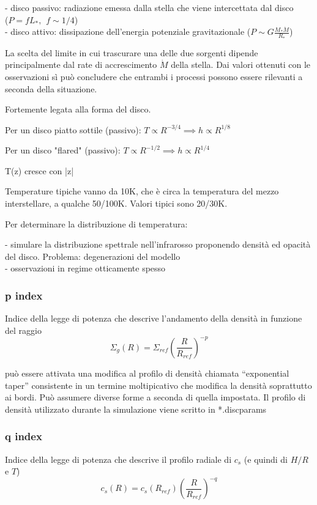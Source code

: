 \documentclass[DIN, pagenumber=false, fontsize=11pt, parskip=half]{scrartcl}
\begin{document}
- disco passivo: radiazione emessa dalla stella che viene intercettata dal disco \\($P=fL_*, \hspace{5pt} f\sim 1/4$) \\
- disco attivo: dissipazione dell'energia potenziale gravitazionale ($P \sim 
G \frac{M_*\dot{M}}{R_*}$)

La scelta del limite in cui trascurare una delle due sorgenti dipende principalmente dal rate di accrescimento $\dot{M}$  della stella. Dai valori ottenuti con le osservazioni sì può concludere che entrambi i processi possono essere rilevanti a seconda della situazione.

Fortemente legata alla forma del disco.

Per un disco piatto sottile (passivo): $T \propto R^{-3/4} \implies h \propto R^{1/8}$

Per un disco "flared" (passivo): $T \propto R^{-1/2} \implies h \propto R^{1/4}$ 

T(z) cresce con |z|

Temperature tipiche vanno da 10K, che è circa la temperatura del mezzo interstellare, a qualche 50/100K. Valori tipici sono 20/30K.

Per determinare la distribuzione di temperatura:

- simulare la distribuzione spettrale nell'infrarosso proponendo densità ed opacità del disco. Problema: degenerazioni del modello\\
- osservazioni in regime otticamente spesso

\subsubsection{p index}
\label{pind}
Indice della legge di potenza che descrive l'andamento della densità in funzione del raggio
\begin{equation}
    \Sigma_g(R) = \Sigma_{ref} \left( \frac{R}{R_{ref}}\right)^{-p}
\end{equation}

può essere attivata una modifica al profilo di densità chiamata ``exponential taper'' consistente in un termine moltipicativo che modifica la densità soprattutto ai bordi. Può assumere diverse forme a seconda di quella impostata.
Il profilo di densità utilizzato durante la simulazione viene scritto in *.discparams

\subsubsection{q index}
\label{qind}
Indice della legge di potenza che descrive il profilo radiale di $c_s$ (e quindi di $H/R$ e $T$)
\begin{equation}
 c_s(R) = c_s(R_{ref}) \left(\frac{R}{R_{ref}} \right)^{-q}
\end{equation}
\end{document}
